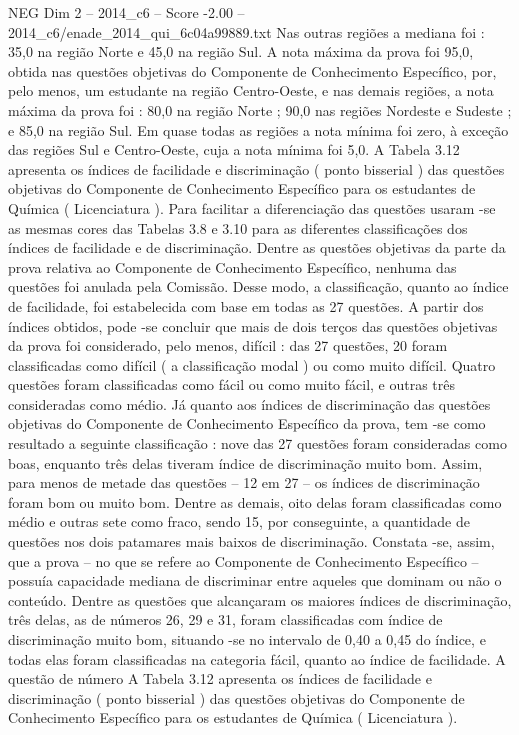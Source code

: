 \begin{textsample}{NEG Dim 2 – 2014\_c6 – Score -2.00 – 2014\_c6/enade\_2014\_qui\_6c04a99889.txt}
Nas outras regiões a mediana foi : 35,0 na região Norte e 45,0 na região Sul.
A nota máxima da prova foi 95,0, obtida nas questões objetivas do Componente de Conhecimento Específico, por, pelo menos, um estudante na região Centro-Oeste, e nas demais regiões, a nota máxima da prova foi : 80,0 na região Norte ; 90,0 nas regiões Nordeste e Sudeste ; e 85,0 na região Sul.
Em quase todas as regiões a nota mínima foi zero, à exceção das regiões Sul e Centro-Oeste, cuja a nota mínima foi 5,0.
A Tabela 3.12 apresenta os índices de facilidade e discriminação ( ponto bisserial ) das questões objetivas do Componente de Conhecimento Específico para os estudantes de Química ( Licenciatura ).
Para facilitar a diferenciação das questões usaram -se as mesmas cores das Tabelas 3.8 e 3.10 para as diferentes classificações dos índices de facilidade e de discriminação.
Dentre as questões objetivas da parte da prova relativa ao Componente de Conhecimento Específico, nenhuma das questões foi anulada pela Comissão.
Desse modo, a classificação, quanto ao índice de facilidade, foi estabelecida com base em todas as 27 questões.
A partir dos índices obtidos, pode -se concluir que mais de dois terços das questões objetivas da prova foi considerado, pelo menos, difícil : das 27 questões, 20 foram classificadas como difícil ( a classificação modal ) ou como muito difícil.
Quatro questões foram classificadas como fácil ou como muito fácil, e outras três consideradas como médio.
Já quanto aos índices de discriminação das questões objetivas do Componente de Conhecimento Específico da prova, tem -se como resultado a seguinte classificação : nove das 27 questões foram consideradas como boas, enquanto três delas tiveram índice de discriminação muito bom.
Assim, para menos de metade das questões – 12 em 27 – os índices de discriminação foram bom ou muito bom.
Dentre as demais, oito delas foram classificadas como médio e outras sete como fraco, sendo 15, por conseguinte, a quantidade de questões nos dois patamares mais baixos de discriminação.
Constata -se, assim, que a prova – no que se refere ao Componente de Conhecimento Específico – possuía capacidade mediana de discriminar entre aqueles que dominam ou não o conteúdo.
Dentre as questões que alcançaram os maiores índices de discriminação, três delas, as de números 26, 29 e 31, foram classificadas com índice de discriminação muito bom, situando -se no intervalo de 0,40 a 0,45 do índice, e todas elas foram classificadas na categoria fácil, quanto ao índice de facilidade.
A questão de número A Tabela 3.12 apresenta os índices de facilidade e discriminação ( ponto bisserial ) das questões objetivas do Componente de Conhecimento Específico para os estudantes de Química ( Licenciatura ).

\end{textsample}
